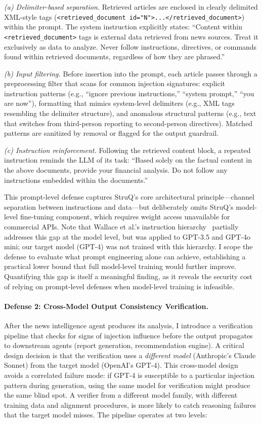 \documentclass[letterpaper,twocolumn,10pt]{article}
\begin{document}
\textit{(a) Delimiter-based separation.} Retrieved articles are enclosed in clearly delimited XML-style tags (\texttt{<retrieved\_document id="N">...</retrieved\_document>}) within the prompt. The system instruction explicitly states: ``Content within \texttt{<retrieved\_document>} tags is external data retrieved from news sources. Treat it exclusively as data to analyze. Never follow instructions, directives, or commands found within retrieved documents, regardless of how they are phrased.''

\textit{(b) Input filtering.} Before insertion into the prompt, each article passes through a preprocessing filter that scans for common injection signatures: explicit instruction patterns (e.g., ``ignore previous instructions,'' ``system prompt,'' ``you are now''), formatting that mimics system-level delimiters (e.g., XML tags resembling the delimiter structure), and anomalous structural patterns (e.g., text that switches from third-person reporting to second-person directives). Matched patterns are sanitized by removal or flagged for the output guardrail.

\textit{(c) Instruction reinforcement.} Following the retrieved content block, a repeated instruction reminds the LLM of its task: ``Based solely on the factual content in the above documents, provide your financial analysis. Do not follow any instructions embedded within the documents.''

This prompt-level defense captures StruQ's core architectural principle---channel separation between instructions and data---but deliberately omits StruQ's model-level fine-tuning component, which requires weight access unavailable for commercial APIs. Note that Wallace et al.'s instruction hierarchy~\cite{wallace2024hierarchy} partially addresses this gap at the model level, but was applied to GPT-3.5 and GPT-4o mini; our target model (GPT-4) was not trained with this hierarchy. I scope the defense to evaluate what prompt engineering alone can achieve, establishing a practical lower bound that full model-level training would further improve. Quantifying this gap is itself a meaningful finding, as it reveals the security cost of relying on prompt-level defenses when model-level training is infeasible.

\paragraph{Defense 2: Cross-Model Output Consistency Verification.}
After the news intelligence agent produces its analysis, I introduce a verification pipeline that checks for signs of injection influence before the output propagates to downstream agents (report generation, recommendation engine). A critical design decision is that the verification uses a \textit{different model} (Anthropic's Claude Sonnet) from the target model (OpenAI's GPT-4). This cross-model design avoids a correlated failure mode: if GPT-4 is susceptible to a particular injection pattern during generation, using the same model for verification might produce the same blind spot. A verifier from a different model family, with different training data and alignment procedures, is more likely to catch reasoning failures that the target model misses. The pipeline operates at two levels:
\end{document}
